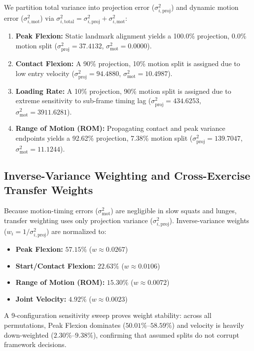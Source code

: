 We partition total variance into projection error ($\sigma^2_{i, \text{proj}}$) and dynamic motion error ($\sigma^2_{i, \text{mot}}$) via $\sigma^2_{i, \text{total}} = \sigma^2_{i, \text{proj}} + \sigma^2_{i, \text{mot}}$:
\begin{enumerate}
  \item \textbf{Peak Flexion:} Static landmark alignment yields a 100.0\% projection, 0.0\% motion split ($\sigma^2_{\text{proj}} = 37.4132$, $\sigma^2_{\text{mot}} = 0.0000$).
  \item \textbf{Contact Flexion:} A 90\% projection, 10\% motion split is assigned due to low entry velocity ($\sigma^2_{\text{proj}} = 94.4880$, $\sigma^2_{\text{mot}} = 10.4987$).
  \item \textbf{Loading Rate:} A 10\% projection, 90\% motion split is assigned due to extreme sensitivity to sub-frame timing lag ($\sigma^2_{\text{proj}} = 434.6253$, $\sigma^2_{\text{mot}} = 3911.6281$).
  \item \textbf{Range of Motion (ROM):} Propagating contact and peak variance endpoints yields a 92.62\% projection, 7.38\% motion split ($\sigma^2_{\text{proj}} = 139.7047$, $\sigma^2_{\text{mot}} = 11.1244$).
\end{enumerate}

\subsection{Inverse-Variance Weighting and Cross-Exercise Transfer Weights}
\label{sec:transfer-weights}

Because motion-timing errors ($\sigma^2_{\text{mot}}$) are negligible in slow squats and lunges, transfer weighting uses only projection variance ($\sigma^2_{i, \text{proj}}$). Inverse-variance weights ($w_i = 1/\sigma^2_{i, \text{proj}}$) are normalized to:
\begin{itemize}
  \item \textbf{Peak Flexion:} $\mathbf{57.15\%}$ ($w \approx 0.0267$)
  \item \textbf{Start/Contact Flexion:} $\mathbf{22.63\%}$ ($w \approx 0.0106$)
  \item \textbf{Range of Motion (ROM):} $\mathbf{15.30\%}$ ($w \approx 0.0072$)
  \item \textbf{Joint Velocity:} $\mathbf{4.92\%}$ ($w \approx 0.0023$)
\end{itemize}

A 9-configuration sensitivity sweep proves weight stability: across all permutations, Peak Flexion dominates ($50.01\%\text{--}58.59\%$) and velocity is heavily down-weighted ($2.30\%\text{--}9.38\%$), confirming that assumed splits do not corrupt framework decisions.


